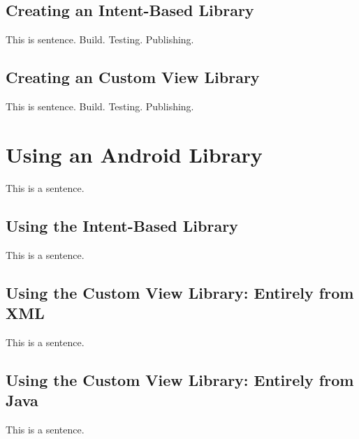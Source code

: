 \subsection{Creating an Intent-Based Library}
This is sentence.
Build.
Testing.
Publishing.

\subsection{Creating an Custom View Library}
This is sentence.
Build.
Testing.
Publishing.

\section{Using an Android Library}
This is a sentence.

\subsection{Using the Intent-Based Library}
This is a sentence.

\subsection{Using the Custom View Library: Entirely from XML}
This is a sentence.


\subsection{Using the Custom View Library: Entirely from Java}
This is a sentence.


